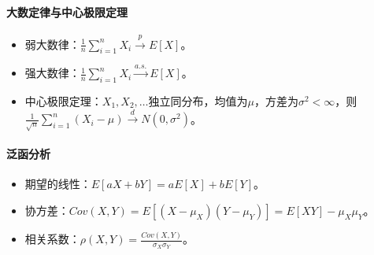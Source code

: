 \documentclass[
12pt, %
a4paper, 
oneside, %
headinclude,footinclude, %
]{scrartcl}
\begin{document}
\paragraph*{大数定律与中心极限定理}
\begin{itemize}
\item 弱大数律：$ \frac{1}{n} \sum_{i=1}^n X_i \xrightarrow{p} E[X] $。
\item 强大数律：$ \frac{1}{n} \sum_{i=1}^n X_i \xrightarrow{a.s.} E[X] $。
\item 中心极限定理：$ X_1, X_2, \dots $独立同分布，均值为$ \mu $，方差为$ \sigma^2 < \infty $，则$ \frac{1}{\sqrt{n}} \sum_{i=1}^n (X_i - \mu) \xrightarrow{d} N(0, \sigma^2) $。
\end{itemize}
\paragraph*{泛函分析}
\begin{itemize}
\item 期望的线性：$ E[aX + bY] = a E[X] + b E[Y] $。
\item 协方差：$ Cov(X, Y) = E[(X - \mu_X)(Y - \mu_Y)] = E[XY] - \mu_X \mu_Y $。
\item 相关系数：$ \rho(X, Y) = \frac{Cov(X, Y)}{\sigma_X \sigma_Y} $。
\end{itemize}
\end{document}
